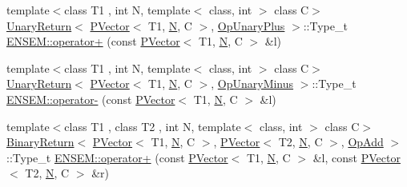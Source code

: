 \begin{DoxyCompactItemize}
{\footnotesize template$<$class T1 , int N, template$<$ class, int $>$ class C$>$ }\\\mbox{\hyperlink{structENSEM_1_1UnaryReturn}{Unary\+Return}}$<$ \mbox{\hyperlink{classENSEM_1_1PVector}{P\+Vector}}$<$ T1, \mbox{\hyperlink{operator__name__util_8cc_a7722c8ecbb62d99aee7ce68b1752f337}{N}}, C $>$, \mbox{\hyperlink{structENSEM_1_1OpUnaryPlus}{Op\+Unary\+Plus}} $>$\+::Type\+\_\+t \mbox{\hyperlink{group__primvector_gadeef49e413dc749206be2cdd675cd802}{E\+N\+S\+E\+M\+::operator+}} (const \mbox{\hyperlink{classENSEM_1_1PVector}{P\+Vector}}$<$ T1, \mbox{\hyperlink{operator__name__util_8cc_a7722c8ecbb62d99aee7ce68b1752f337}{N}}, C $>$ \&l)
\item 
{\footnotesize template$<$class T1 , int N, template$<$ class, int $>$ class C$>$ }\\\mbox{\hyperlink{structENSEM_1_1UnaryReturn}{Unary\+Return}}$<$ \mbox{\hyperlink{classENSEM_1_1PVector}{P\+Vector}}$<$ T1, \mbox{\hyperlink{operator__name__util_8cc_a7722c8ecbb62d99aee7ce68b1752f337}{N}}, C $>$, \mbox{\hyperlink{structENSEM_1_1OpUnaryMinus}{Op\+Unary\+Minus}} $>$\+::Type\+\_\+t \mbox{\hyperlink{group__primvector_ga7f5358cd7aff24dea49436228e259ade}{E\+N\+S\+E\+M\+::operator-\/}} (const \mbox{\hyperlink{classENSEM_1_1PVector}{P\+Vector}}$<$ T1, \mbox{\hyperlink{operator__name__util_8cc_a7722c8ecbb62d99aee7ce68b1752f337}{N}}, C $>$ \&l)
\item 
{\footnotesize template$<$class T1 , class T2 , int N, template$<$ class, int $>$ class C$>$ }\\\mbox{\hyperlink{structENSEM_1_1BinaryReturn}{Binary\+Return}}$<$ \mbox{\hyperlink{classENSEM_1_1PVector}{P\+Vector}}$<$ T1, \mbox{\hyperlink{operator__name__util_8cc_a7722c8ecbb62d99aee7ce68b1752f337}{N}}, C $>$, \mbox{\hyperlink{classENSEM_1_1PVector}{P\+Vector}}$<$ T2, \mbox{\hyperlink{operator__name__util_8cc_a7722c8ecbb62d99aee7ce68b1752f337}{N}}, C $>$, \mbox{\hyperlink{structENSEM_1_1OpAdd}{Op\+Add}} $>$\+::Type\+\_\+t \mbox{\hyperlink{group__primvector_gaec1b75dc112e9c2300475f1dddbff722}{E\+N\+S\+E\+M\+::operator+}} (const \mbox{\hyperlink{classENSEM_1_1PVector}{P\+Vector}}$<$ T1, \mbox{\hyperlink{operator__name__util_8cc_a7722c8ecbb62d99aee7ce68b1752f337}{N}}, C $>$ \&l, const \mbox{\hyperlink{classENSEM_1_1PVector}{P\+Vector}}$<$ T2, \mbox{\hyperlink{operator__name__util_8cc_a7722c8ecbb62d99aee7ce68b1752f337}{N}}, C $>$ \&r)
\item 

\end{DoxyCompactItemize}
